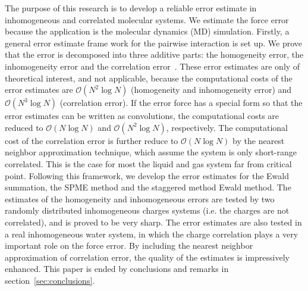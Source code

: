 \documentclass[aps,pre,preprint]{revtex4}
\begin{document}
The purpose of this research is to develop a reliable  error
estimate in inhomogeneous and correlated molecular systems.
We estimate the force error because the application is the molecular
dynamics (MD) simulation.  Firstly, a general error estimate
frame work for the pairwise interaction is set up. We prove that the
error is decomposed into three additive parts: the homogeneity error,
the inhomogeneity error and the correlation error~\cite{wang2012}.
These error estimates are only of theoretical interest, and
not applicable, because the computational costs of the error estimates
are $\mathcal O(N^2\log N)$ (homogeneity and inhomogeneity error)
and $\mathcal O(N^3\log N)$ (correlation error).
If the error force has a special form so that the error estimates
can be written as convolutions, the computational costs
are reduced to $\mathcal O(N\log N)$ and 
$\mathcal O(N^2\log N)$, respectively.
The computational cost of the correlation error is further
reduce to $\mathcal O(N\log N)$ by the nearest neighbor approximation
technique, which assume the system is only short-range correlated. This
is the case for most the liquid and gas system far from critical point.
Following this framework, we
develop the error estimates for the Ewald summation, the SPME method
and the staggered method Ewald method.   The estimates
of the homogeneity and inhomogeneous errors are tested by two
randomly distributed inhomogeneous charges systems
(i.e. the charges are not correlated), and is proved to
be very sharp.
The error estimates are also tested in a real inhomogeneous water system,
in which the charge correlation plays a very important role
on the force error. By 
including the nearest neighbor approximation of
correlation error, the quality of the estimates
is impressively enhanced.
This paper is ended by conclusions and remarks in
section~\ref{sec:conclusions}.



\end{document}
